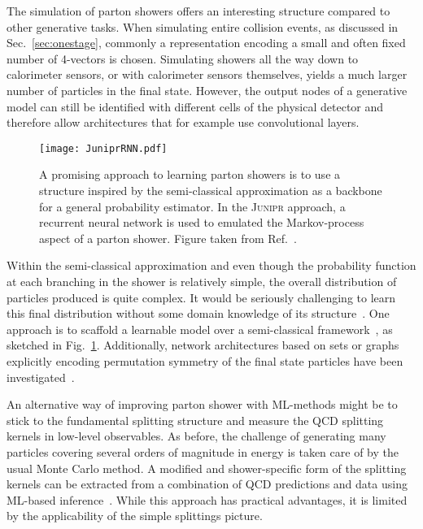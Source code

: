 \documentclass[submission,Phys]{SciPost}
\begin{document}
The simulation of parton showers offers an interesting structure compared to other generative tasks. When simulating entire collision events, as discussed in Sec.~\ref{sec:onestage}, commonly a representation encoding a small and often fixed number of 4-vectors is chosen. Simulating showers all the way down to calorimeter sensors, or with calorimeter sensors themselves, yields a much larger number of particles in the final state. However, the output nodes of a generative model can still be identified with different cells of the physical detector and therefore allow architectures that for example use convolutional layers.

\begin{figure}[t]
\centering
  \texttt{[image: JuniprRNN.pdf]}
  \caption{A promising approach to learning parton showers is to use a structure inspired by the semi-classical approximation as a backbone for a general probability estimator. In the \textsc{Junipr} approach, a recurrent neural network is used to emulated the Markov-process aspect of a parton shower. Figure taken from Ref.~\cite{juniprbinary}.}
  \label{fig:junipr}
\end{figure}

Within the semi-classical approximation and even though the probability function at each branching in the shower is relatively simple, the overall distribution of particles produced is quite complex. It would be seriously challenging to learn this final distribution without some domain knowledge of its structure~\cite{Lai:2020byl}. One approach is to scaffold a learnable model over a semi-classical framework~\cite{juniprshower,juniprbinary}, as sketched in Fig.~\ref{fig:junipr}. Additionally, network architectures based on sets or graphs explicitly encoding permutation symmetry of the final state particles have been investigated~\cite{shower,locationGAN,monkshower,Dohi:2020eda,Orzari:2021suh,Tsan:2021brw}.

An alternative way of improving parton shower with ML-methods might be to stick to the fundamental splitting structure and measure the QCD splitting kernels in low-level observables. As before, the challenge of generating many particles covering several orders of magnitude in energy is taken care of by the usual Monte Carlo method. A modified and shower-specific form of the splitting kernels can be extracted from a combination of QCD predictions and data using ML-based inference~\cite{Bieringer:2020tnw}. While this approach has practical advantages, it is limited by the applicability of the simple splittings picture.
\end{document}
